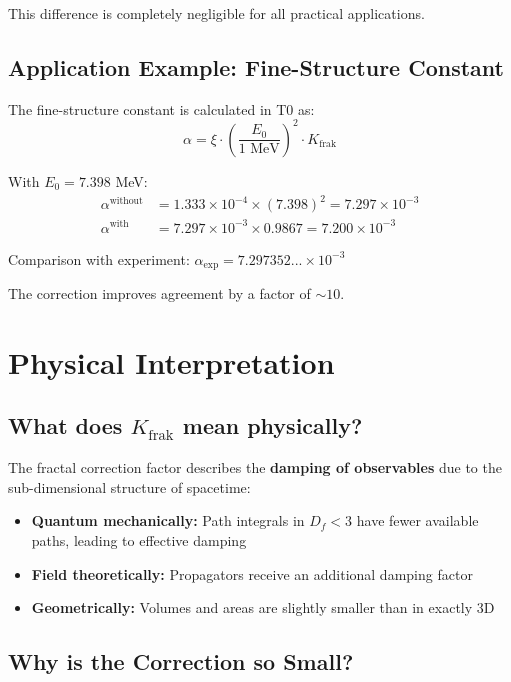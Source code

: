 	This difference is completely negligible for all practical applications.
	
	\subsection{Application Example: Fine-Structure Constant}
	
	The fine-structure constant is calculated in T0 as:
	\begin{equation}
		\alpha = \xi \cdot \left(\frac{E_0}{1 \text{ MeV}}\right)^2 \cdot K_{\text{frak}}
	\end{equation}
	
	With $E_0 = 7.398$ MeV:
	\begin{align}
		\alpha^{\text{without}} &= 1.333 \times 10^{-4} \times (7.398)^2 = 7.297 \times 10^{-3} \\
		\alpha^{\text{with}} &= 7.297 \times 10^{-3} \times 0.9867 = 7.200 \times 10^{-3}
	\end{align}
	
	Comparison with experiment: $\alpha_{\text{exp}} = 7.297352... \times 10^{-3}$
	
	The correction improves agreement by a factor of $\sim 10$.
	
	\section{Physical Interpretation}
	
	\subsection{What does $K_{\text{frak}}$ mean physically?}
	
	The fractal correction factor describes the \textbf{damping of observables} due to the sub-dimensional structure of spacetime:
	
	\begin{itemize}
		\item \textbf{Quantum mechanically:} Path integrals in $D_f < 3$ have fewer available paths, leading to effective damping
		\item \textbf{Field theoretically:} Propagators receive an additional damping factor
		\item \textbf{Geometrically:} Volumes and areas are slightly smaller than in exactly 3D
	\end{itemize}
	
	\subsection{Why is the Correction so Small?}
	
